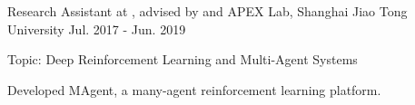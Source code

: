 \begin{cventries}

\cventry
    {Research Assistant at , advised by  and } %
    {APEX Lab, Shanghai Jiao Tong University} %
    {Jul. 2017 - Jun. 2019} %
    {} %
	{
		\begin{cvitems} %
			\item{Topic: Deep Reinforcement Learning and Multi-Agent Systems}
			\item{Developed MAgent, a many-agent reinforcement learning platform.}
		\end{cvitems}
	}

\end{cventries}
